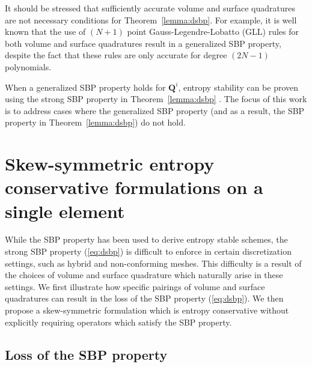 \documentclass{svjour3}                     %
\renewcommand{\hat}{\widehat}
\newcommand{\LRp}[1]{\left( #1 \right)}
\begin{document}
\begin{remark}
It should be stressed that sufficiently accurate volume and surface quadratures are not necessary conditions for Theorem~\ref{lemma:dsbp}.  For example, it is well known that the use of $(N+1)$ point Gauss-Legendre-Lobatto (GLL) rules for both volume and surface quadratures result in a generalized SBP property, despite the fact that these rules are only accurate for degree $(2N-1)$ polynomials.  
\label{remark:dsbp}
\end{remark}

When a generalized SBP property holds for $\bm{Q}^i$, entropy stability can be proven using the strong SBP property in Theorem~\ref{lemma:dsbp} \cite{chan2017discretely, chan2018discretely}.  The focus of this work is to address cases where the generalized SBP property (and as a result, the SBP property in Theorem~\ref{lemma:dsbp}) do not hold. 

\section{Skew-symmetric entropy conservative formulations on a single element}
\label{sec:skew1}
While the SBP property has been used to derive entropy stable schemes, the strong SBP property (\ref{eq:dsbp}) is difficult to enforce in certain discretization settings, such as hybrid and non-conforming meshes.  This difficulty is a result of the choices of volume and surface quadrature which naturally arise in these settings.  We first illustrate how specific pairings of volume and surface quadratures can result in the loss of the SBP property (\ref{eq:dsbp}).  We then propose a skew-symmetric formulation which is entropy conservative without explicitly requiring operators which satisfy the SBP property.  

\subsection{Loss of the SBP property}
\end{document}
